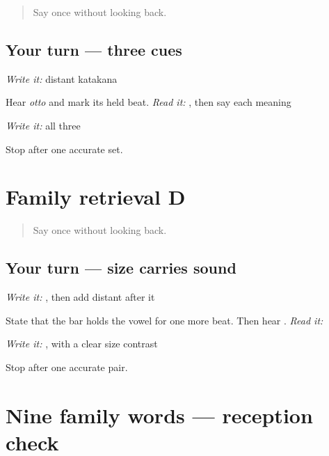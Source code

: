\label{lesson:JA-R13-family-c}



\begin{quote}
Say \textbf{} once without looking back.
\end{quote}

\subsection*{Your turn — three cues}
\emph{Write it:} distant katakana \textbf{}

Hear \emph{otto} and mark its held beat. \emph{Read it:} \textbf{}, then say each meaning

\emph{Write it:} all three

\begin{tcolorbox}[breakable,colback=teal!4,colframe=teal!35!black,title={Before you move on}]
Stop after one accurate set.
\end{tcolorbox}
\section[Practice]{Family retrieval D}

\label{lesson:JA-R13-family-d}



\begin{quote}
Say \textbf{} once without looking back.
\end{quote}

\subsection*{Your turn — size carries sound}
\emph{Write it:} \textbf{}, then add distant \textbf{} after it

State that the bar holds the vowel for one more beat. Then hear \textbf{}. \emph{Read it:} \textbf{}

\emph{Write it:} \textbf{}, with a clear size contrast

\begin{tcolorbox}[breakable,colback=teal!4,colframe=teal!35!black,title={Before you move on}]
Stop after one accurate pair.
\end{tcolorbox}
\section[Practice]{Nine family words — reception check}

